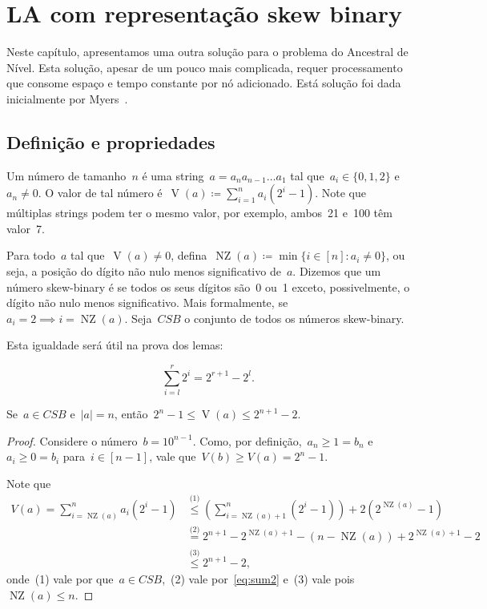 \documentclass[main.tex]{subfiles}
\newcommand{\NZ}{\operatorname{NZ}}
\newcommand{\CSB}{\textit{CSB}}
\renewcommand{\V}{\operatorname{V}}
\begin{document}
\chapter{LA com representação skew binary} \label{cap:skew}

Neste capítulo, apresentamos uma outra solução para o problema do Ancestral de Nível. Esta solução, apesar de um pouco mais complicada, requer processamento que consome espaço e tempo constante por nó adicionado. Está solução foi dada inicialmente por Myers~\cite{Myers83}.

\section{Definição e propriedades}

Um número  de tamanho~$n$ é uma string~${a = a_n a_{n-1} \ldots a_1}$ tal que~${a_i \in \{0, 1, 2\}}$ e~$a_n \neq 0$. O valor de tal número é~${\V(a) \coloneqq \sum\limits_{i = 1}^n{a_i (2^i - 1)}}$. Note que múltiplas strings podem ter o mesmo valor, por exemplo, ambos~21 e~100 têm valor~7.

Para todo~$a$ tal que~$\V(a) \neq 0$, defina~$\NZ(a) \coloneqq \min\{i \in [n] : a_i \neq 0\}$, ou seja, a posição do dígito não nulo menos significativo de~$a$. Dizemos que um número skew-binary é  se todos os seus dígitos são~0 ou~1 exceto, possivelmente, o dígito não nulo menos significativo. Mais formalmente, se~${a_i = 2 \implies i = \NZ(a)}$. Seja~$\CSB$ o conjunto de todos os números skew-binary.

Esta igualdade será útil na prova dos lemas:

\begin{equation} \tag{A} \label{eq:sum2}
	\sum\limits_{i = l}^r{2^i} = 2^{r+1} - 2^{l}.
\end{equation}

\begin{lemma} \label{lem:csbdig}
	Se~$a \in \CSB$ e~$|a| = n$, então~$2^n - 1 \leq \V(a) \leq 2^{n+1}-2$.
\end{lemma}
\begin{proof}
	Considere o número~$b = 10^{n-1}$. Como, por definição,~$a_n \geq 1 = b_n$ e~$a_i \geq 0 = b_i$ para~$i \in [n - 1]$, vale que~$V(b) \geq V(a) = 2^n - 1$.

	Note que
	\begin{align*}
	V(a) = \sum\limits_{i = \NZ(a)}^n{a_i (2^i - 1)} &\stackrel{\text{(1)}}{\leq} \left(\sum\limits_{i = \NZ(a) + 1}^n (2^i - 1)\right) + 2 (2^{\NZ(a)} - 1) \\
	&\stackrel{\text{(2)}}{=} 2^{n+1} - 2^{\NZ(a)+1} - (n - \NZ(a)) + 2^{\NZ(a) + 1} - 2 \\
	&\stackrel{\text{(3)}}{\leq} 2^{n+1} - 2,
	\end{align*}
	onde~(1) vale por que~$a \in \CSB$,~(2) vale por~\eqref{eq:sum2} e~(3) vale pois~$\NZ(a) \leq n$.

\end{proof}
\end{document}
